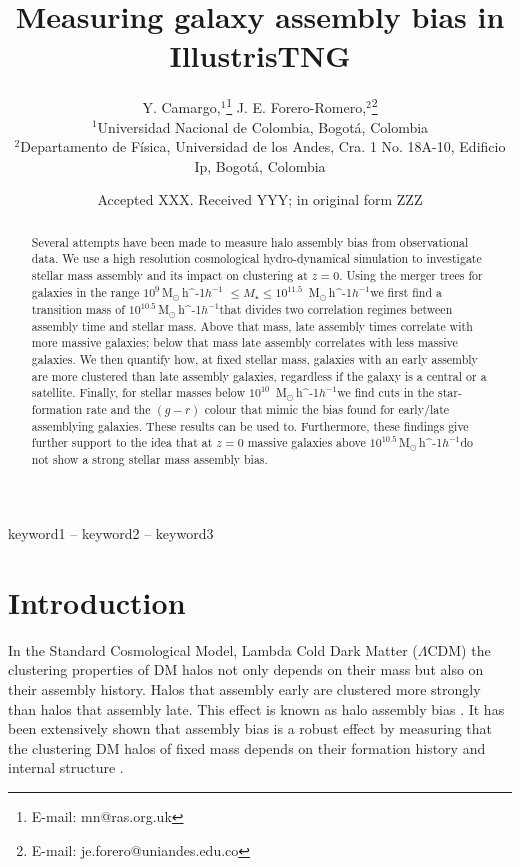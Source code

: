 \documentclass[fleqn,usenatbib]{mnras}
\title[Galaxy Assembly Bias]{Measuring galaxy assembly bias in IllustrisTNG}
\author[Camargo, Y. \& Forero-Romero J. E.]{
Y. Camargo,$^{1}$\thanks{E-mail: mn@ras.org.uk}
J. E. Forero-Romero,$^{2}$\thanks{E-mail: je.forero@uniandes.edu.co}
\\
$^{1}$Universidad Nacional de Colombia, Bogot\'a, Colombia\\
$^{2}$Departamento de F\'isica, Universidad de los Andes, Cra. 1 No.
18A-10, Edificio Ip, Bogot\'a, Colombia\\
}
\date{Accepted XXX. Received YYY; in original form ZZZ}
\newcommand{\Msunh}{\,{\rm M}$_{\odot}$\,\ifmmode h^{-1}\else $h^{-1}$\fi}
\begin{document}
\label{firstpage}
\pagerange{\pageref{firstpage}--\pageref{lastpage}}
\maketitle

\begin{abstract}

Several attempts have been made to measure halo assembly bias from
 observational data.
    We use a high resolution cosmological hydro-dynamical simulation
    to investigate stellar mass assembly 
    and its impact on clustering at $z=0$.
    Using the merger trees for galaxies in the range $10^{9}$\Msunh
    $\leq M_{\star} \leq 10^{11.5}$ \Msunh we first find a transition
    mass of $10^{10.5}$\Msunh that divides two 
    correlation regimes between assembly time and stellar mass.
    Above that mass, late assembly times correlate with more massive
    galaxies; below that mass late assembly correlates with less massive
galaxies.
We then quantify how, at fixed stellar mass, galaxies with an early
assembly
are more clustered than late assembly galaxies, regardless if the galaxy
is a central or a satellite.
Finally, for stellar masses below $10^{10}$ \Msunh we find 
cuts in the star-formation rate and the $(g-r)$ colour that mimic
the bias found for early/late assemblying galaxies.
These results can be used to.
Furthermore, these findings give further support to the idea that at
$z=0$  massive galaxies above $10^{10.5}$\Msunh do not show a strong
stellar mass assembly bias.
\end{abstract}

\begin{keywords}
keyword1 -- keyword2 -- keyword3
\end{keywords}



\section{Introduction}
In the Standard Cosmological Model, Lambda Cold Dark Matter
($\Lambda$CDM) the clustering properties of DM halos not only depends on their mass
but also on their assembly history.
Halos that assembly early are clustered more strongly
than halos that assembly late.
This effect is known as halo assembly bias \citep{2005MNRAS.363L..66G}.
It has been extensively shown  that
assembly bias is a robust effect
by measuring that the clustering DM halos of fixed mass depends on their formation history and internal structure \citep{2006ApJ...652...71W,2008ApJ...687...12D}.
\end{document}
